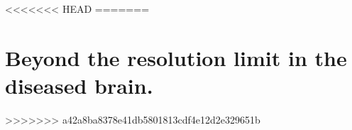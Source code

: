 <<<<<<< HEAD
% 
=======
\chapter{Beyond the resolution limit in the diseased brain.}
>>>>>>> a42a8ba8378e41db5801813cdf4e12d2e329651b




% 
% 


% 
% 

%
